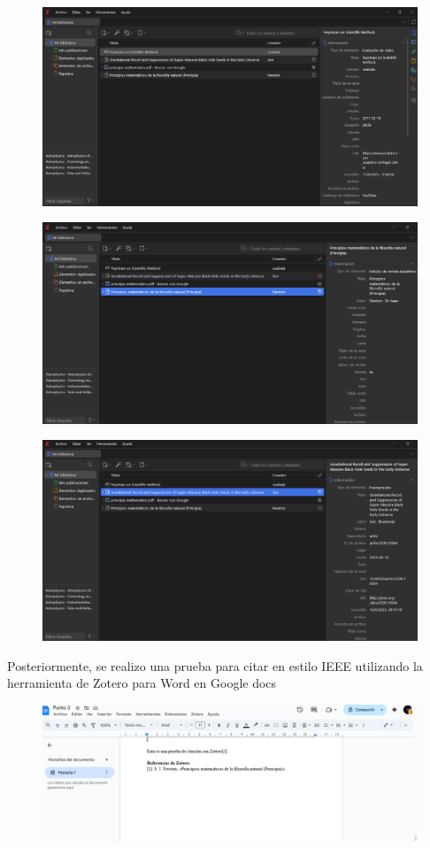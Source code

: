 \documentclass[12pt]{exam}
\begin{document}
\begin{figure}[H]
    \centering
    \includegraphics[width=0.8\linewidth]{Zotero 1.png}
    \label{}
\end{figure}
\begin{figure}[H]
    \centering
    \includegraphics[width=0.8\linewidth]{Zotero libro.png}
    \label{}
\end{figure}
\begin{figure}[H]
    \centering
    \includegraphics[width=0.8\linewidth]{zotero articulo.png}
    \label{}
\end{figure}

Posteriormente, se realizo una prueba para citar en estilo IEEE utilizando la herramienta de Zotero para Word en Google docs 

\begin{figure}[H]
    \centering
    \includegraphics[width=0.8\linewidth]{word zotero.png}
    \label{}
\end{figure}
\end{document}
